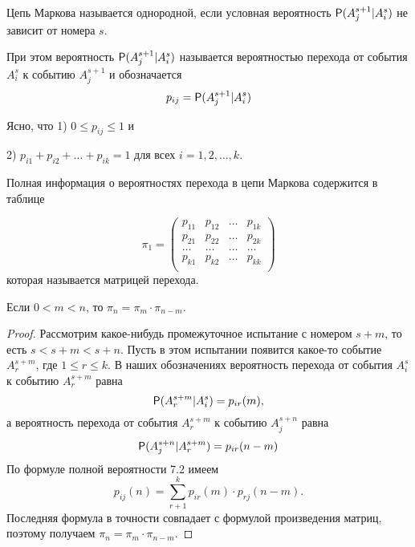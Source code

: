 \begin{definition}
Цепь Маркова называется однородной, если условная вероятность $\P(A^{s+1}_j|A^s_i)$ не зависит от номера $s$.

При этом вероятность $\P(A^{s+1}_j|A^s_i)$ называется вероятностью перехода от события $A^s_i$ к событию $A^{s+1}_j$ и обозначается
$$p_{ij} = \P(A^{s+1}_j|A^s_i)$$
\end{definition}

\begin{zam}
Ясно, что
1) $0 \leq p_{ij} \leq 1$ и

2) $p_{i1} + p_{i2} + \ldots + p_{ik} = 1$ для всех $i = 1, 2, \ldots , k.$
\end{zam}

\begin{definition}
Полная информация о вероятностях перехода в цепи Маркова содержится в таблице

$$\pi_1 = \begin{pmatrix} 
p_{11} & p_{12} & \ldots & p_{1k}\\
p_{21} & p_{22} & \ldots & p_{2k}\\
\ldots & \ldots & \ldots & \ldots\\
p_{k1} & p_{k2} & \ldots & p_{kk}\\
\end{pmatrix}
$$
которая называется матрицей перехода.
\end{definition}


\begin{theorem}
	Если $0 < m < n$, то $\pi_n = \pi_m \cdot \pi_{n−m} .$
\end{theorem}

\begin{proof}
Рассмотрим какое-нибудь промежуточное испытание с номером $s + m$, то есть $s < s + m < s + n$. Пусть в этом испытании появится какое-то событие $A^{s+m}_r$, где $1 \leq r \leq k$. В наших обозначениях вероятность перехода от события $A^s_i$ к событию $A^{s+m}_r$ равна
$$\P(A^{s+m}_r|A^s_i) = p_{ir}(m),$$
а вероятность перехода от события $A^{s+m}_r$ к событию $A^{s+n}_j$ равна
$$\P(A^{s+n}_j|A^{s+m}_r) = p_{ir}(n-m)$$
По формуле полной вероятности 7.2 имеем
$$p_{ij}(n) = \sum\limits_{r+1}^k p_{ir}(m) \cdot p_{rj}(n-m).$$
Последняя формула в точности совпадает с формулой произведения матриц, поэтому получаем $\pi_n = \pi_m \cdot \pi_{n−m} .$
\end{proof} 

